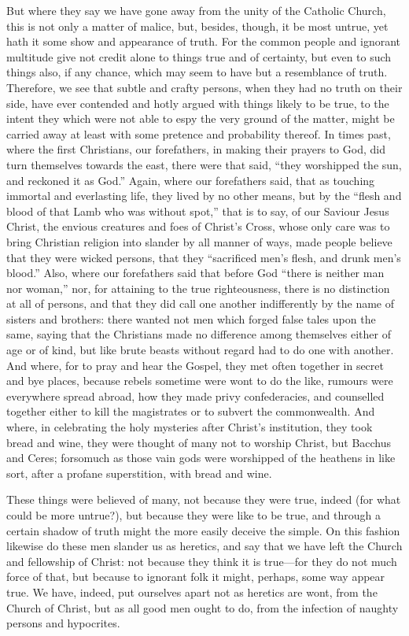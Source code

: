But where they say we have gone away from the unity of the Catholic
Church, this is not only a matter
of malice, but, besides, though, it be most untrue, yet hath it some
show and appearance of truth. For the common people and ignorant
multitude give not credit alone to things true and of certainty, but
even to such things also, if any chance, which may seem to have but
a resemblance of truth. Therefore, we see that subtle and crafty
persons, when they had no truth on their side, have ever contended and
hotly argued with things likely to be true, to the intent they which
were not able to espy the very ground of the matter, might be carried
away at least with some pretence and probability thereof. In times
past, where the first Christians, our forefathers, in making their prayers
to God, did turn themselves towards the east, there were that said,
“they worshipped the sun, and reckoned it as God.”
Again, where our forefathers said, that as touching immortal and everlasting
life, they lived by no other means, but by the “flesh and blood
of that Lamb who was without spot,” that is to say, of our Saviour
Jesus Christ, the envious creatures and foes of Christ’s Cross,
whose only care was to bring Christian religion into slander by all
manner of ways, made people believe that they were wicked persons, that
they “sacrificed men’s flesh, and drunk men’s blood.”
Also, where our forefathers said
that before God “there is neither man nor woman,” nor, for
attaining to the true righteousness, there is no distinction at all
of persons, and that they did call one another indifferently by the
name of sisters and brothers: there wanted not men which forged false
tales upon the same, saying that the Christians made no difference among
themselves either of age or of kind, but like brute beasts without regard
had to do one with another. And where, for to pray and hear the
Gospel, they met often together in secret and bye places, because rebels
sometime were wont to do the like, rumours were everywhere spread abroad,
how they made privy confederacies, and counselled together either to
kill the magistrates or to subvert the commonwealth. And where,
in celebrating the holy mysteries after Christ’s institution,
they took bread and wine, they were thought of many not to worship Christ,
but Bacchus and Ceres; forsomuch as those vain gods were worshipped
of the heathens in like sort, after a profane superstition, with bread
and wine.

These things were believed of many, not because they were true, indeed
(for what could be more untrue?), but because they were like to be true,
and through a certain shadow of truth might the more easily
deceive the simple. On this fashion likewise do these men slander
us as heretics, and say that we have left the Church and fellowship
of Christ: not because they think it is true—for they do not much
force of that, but because to ignorant folk it might, perhaps, some
way appear true. We have, indeed, put ourselves apart not as heretics
are wont, from the Church of Christ, but as all good men ought to do,
from the infection of naughty persons and hypocrites.

